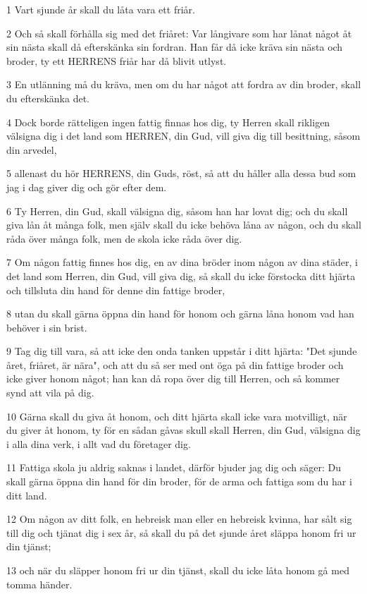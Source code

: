 \par 1 Vart sjunde år skall du låta vara ett friår.
\par 2 Och så skall förhålla sig med det friåret: Var långivare som har lånat något åt sin nästa skall då efterskänka sin fordran. Han får då icke kräva sin nästa och broder, ty ett HERRENS friår har då blivit utlyst.
\par 3 En utlänning må du kräva, men om du har något att fordra av din broder, skall du efterskänka det.
\par 4 Dock borde rätteligen ingen fattig finnas hos dig, ty Herren skall rikligen välsigna dig i det land som HERREN, din Gud, vill giva dig till besittning, såsom din arvedel,
\par 5 allenast du hör HERRENS, din Guds, röst, så att du håller alla dessa bud som jag i dag giver dig och gör efter dem.
\par 6 Ty Herren, din Gud, skall välsigna dig, såsom han har lovat dig; och du skall giva lån åt många folk, men själv skall du icke behöva låna av någon, och du skall råda över många folk, men de skola icke råda över dig.
\par 7 Om någon fattig finnes hos dig, en av dina bröder inom någon av dina städer, i det land som Herren, din Gud, vill giva dig, så skall du icke förstocka ditt hjärta och tillsluta din hand för denne din fattige broder,
\par 8 utan du skall gärna öppna din hand för honom och gärna låna honom vad han behöver i sin brist.
\par 9 Tag dig till vara, så att icke den onda tanken uppstår i ditt hjärta: "Det sjunde året, friåret, är nära", och att du så ser med ont öga på din fattige broder och icke giver honom något; han kan då ropa över dig till Herren, och så kommer synd att vila på dig.
\par 10 Gärna skall du giva åt honom, och ditt hjärta skall icke vara motvilligt, när du giver åt honom, ty för en sådan gåvas skull skall Herren, din Gud, välsigna dig i alla dina verk, i allt vad du företager dig.
\par 11 Fattiga skola ju aldrig saknas i landet, därför bjuder jag dig och säger: Du skall gärna öppna din hand för din broder, för de arma och fattiga som du har i ditt land.
\par 12 Om någon av ditt folk, en hebreisk man eller en hebreisk kvinna, har sålt sig till dig och tjänat dig i sex år, så skall du på det sjunde året släppa honom fri ur din tjänst;
\par 13 och när du släpper honom fri ur din tjänst, skall du icke låta honom gå med tomma händer.
